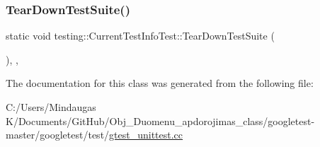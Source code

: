 \mbox{\label{classtesting_1_1_current_test_info_test_a6d4688ba63080fe8fc44a6677503de76}} 
\subsubsection{\texorpdfstring{TearDownTestSuite()}{TearDownTestSuite()}\hspace{0.1cm}{\footnotesize\ttfamily [2/2]}}
{\footnotesize\ttfamily static void testing\+::\+Current\+Test\+Info\+Test\+::\+Tear\+Down\+Test\+Suite (\begin{DoxyParamCaption}{ }\end{DoxyParamCaption})\hspace{0.3cm}{\ttfamily [inline]}, {\ttfamily [static]}, {\ttfamily [protected]}}



The documentation for this class was generated from the following file\+:\begin{DoxyCompactItemize}
\item 
C\+:/\+Users/\+Mindaugas K/\+Documents/\+Git\+Hub/\+Obj\+\_\+\+Duomenu\+\_\+apdorojimas\+\_\+class/googletest-\/master/googletest/test/\mbox{\hyperlink{googletest-master_2googletest_2test_2gtest__unittest_8cc}{gtest\+\_\+unittest.\+cc}}\end{DoxyCompactItemize}
